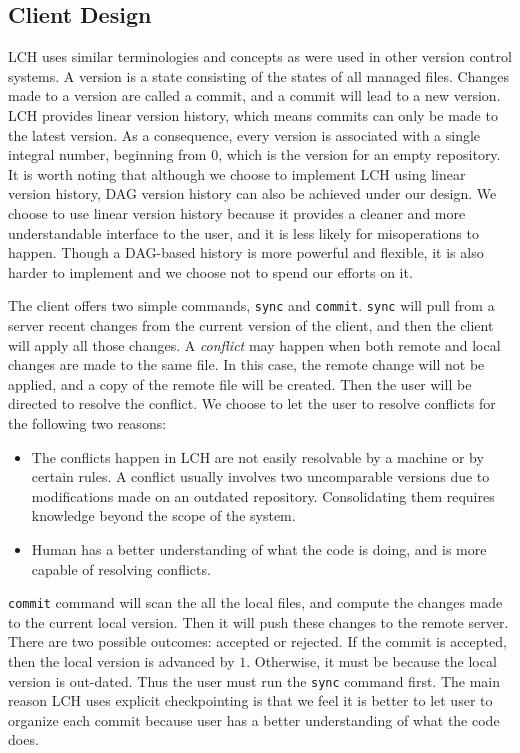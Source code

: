 \documentclass[11pt]{article}
\begin{document}
\subsection{Client Design}
LCH uses similar terminologies and concepts as were used in other version control systems.
A version is a state consisting of the states of all managed files.
Changes made to a version are called a commit, and a commit will lead to a new version.
LCH provides linear version history, which means commits can only be made to the latest version.
As a consequence, every version is associated with a single integral number, beginning from $0$, which is the version for an empty repository.
It is worth noting that although we choose to implement LCH using linear version history, DAG version history can also be achieved under our design.
We choose to use linear version history because it provides a cleaner and more understandable interface to the user, and it is less likely for misoperations to happen.
Though a DAG-based history is more powerful and flexible, it is also harder to implement and we choose not to spend our efforts on it.

The client offers two simple commands, \texttt{sync} and \texttt{commit}.
\texttt{sync} will pull from a server recent changes from the current version of the client, and then the client will apply all those changes.
A \emph{conflict} may happen when both remote and local changes are made to the same file.
In this case, the remote change will not be applied, and a copy of the remote file will be created.
Then the user will be directed to resolve the conflict.
We choose to let the user to resolve conflicts for the following two reasons:
\begin{itemize}
    \item The conflicts happen in LCH are not easily resolvable by a machine or by certain rules.
        A conflict usually involves two uncomparable versions due to modifications made on an outdated repository.
        Consolidating them requires knowledge beyond the scope of the system.
    \item Human has a better understanding of what the code is doing, and is more capable of resolving conflicts.
\end{itemize}

\texttt{commit} command will scan the all the local files, and compute the changes made to the current local version.
Then it will push these changes to the remote server.
There are two possible outcomes: accepted or rejected.
If the commit is accepted, then the local version is advanced by $1$.
Otherwise, it must be because the local version is out-dated.
Thus the user must run the \texttt{sync} command first.
The main reason LCH uses explicit checkpointing is that we feel it is better to let user to organize each commit because user has a better understanding of what the code does.
\end{document}
